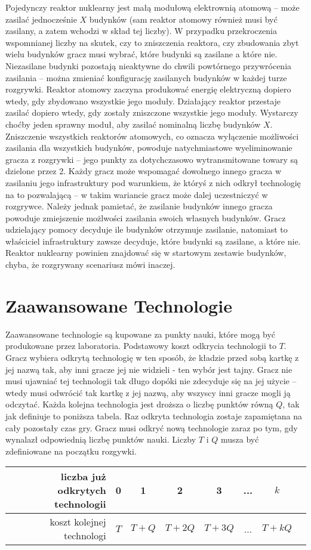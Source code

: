 \documentclass[11pt,a4paper]{article}
\begin{document}
Pojedynczy reaktor nuklearny jest małą modułową elektrownią atomową -- może zasilać jednocześnie $X$ budynków (sam reaktor atomowy również musi być zasilany, a zatem wchodzi w skład tej liczby). W przypadku przekroczenia wspomnianej liczby na skutek, czy to zniszczenia reaktora, czy zbudowania zbyt wielu budynków gracz musi wybrać, które budynki są zasilane a które nie. Niezasilane budynki pozostają nieaktywne do chwili powtórnego przywrócenia zasilania -- można zmieniać konfigurację zasilanych budynków w każdej turze rozgrywki. Reaktor atomowy zaczyna produkować energię elektryczną dopiero wtedy, gdy zbydowano wszystkie jego moduły. Działający reaktor przestaje zasilać dopiero wtedy, gdy zostały zniszczone wszystkie jego moduły. Wystarczy choćby jeden sprawny moduł, aby zasilać nominalną liczbę budynków $X$. Zniszczenie wszystkich reaktorów atomowych, co oznacza wyłączenie możliwości zasilania dla wszystkich budynków, powoduje natychmiastowe wyeliminowanie gracza z rozgrywki -- jego punkty za dotychczasowo wytransmitowane towary są dzielone przez 2. Każdy gracz może wspomagać dowolnego innego gracza w zasilaniu jego infrastruktury pod warunkiem, że któryś z nich odkrył technologię na to pozwalającą -- w takim wariancie gracz może dalej uczestniczyć w rozgrywce. Należy jednak pamietać, że zasilanie budynków innego gracza powoduje zmiejszenie możlwości zasilania swoich własnych budynków. Gracz udzielający pomocy decyduje ile budynków otrzymuje zasilanie, natomiast to właściciel infrastruktury zawsze decyduje, które budynki są zasilane, a które nie. Reaktor nuklearny powinien znajdować się w startowym zestawie budynków, chyba, że rozgrywany scenariusz mówi inaczej.

\section{Zaawansowane Technologie}

Zaawansowane technologie są kupowane za punkty nauki, które mogą być produkowane przez laboratoria. Podstawowy koszt odkrycia technologii to $T$. Gracz wybiera odkrytą technologię w ten sposób, że kładzie przed sobą kartkę z jej nazwą tak, aby inni gracze jej nie widzieli - ten wybór jest tajny. Gracz nie musi ujawniać tej technologii tak długo dopóki nie zdecyduje się na jej użycie -- wtedy musi odwrócić tak kartkę z jej nazwą, aby wszyscy inni gracze mogli ją odczytać. Każda kolejna technologia jest droższa o liczbę punktów równą $Q$, tak jak definiuje to poniższa tabela. Raz odkryta technologia zostaje zapamiętana na cały pozostały czas gry. Gracz musi odkryć nową technologie zaraz po tym, gdy wynalazł odpowiednią liczbę punktów nauki. Liczby $T$ i $Q$ musza być zdefiniowane na początku rozgywki.
\begin{center}
  \begin{tabular}{| r | c | c | c | c | c | c | c |}
    \hline
    liczba już odkrytych technologii & 0 & 1 & 2 & 3  & ... & $k$ \\
    \hline
    koszt kolejnej technologi & $T$ & $T+Q$ & $T+2Q$ & $T+3Q$ & ... & $T+kQ$ \\
    \hline
  \end{tabular}
\end{center}
\end{document}
